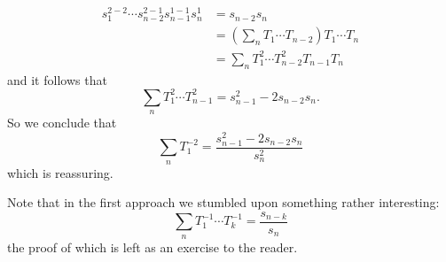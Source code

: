 \begin{sol}
\begin{enumerate}
            \begin{align*}
                s_1^{2-2}\cdots s_{n-2}^{2-1}s_{n-1}^{1-1}s_n^1&=s_{n-2}s_n\\
                &=\left(\sum_n T_1\cdots T_{n-2}\right)T_1\cdots T_n\\
                &=\sum_n T_1^2\cdots T_{n-2}^2 T_{n-1}T_n
            \end{align*}
            and it follows that
            $$\sum_n T_1^2\cdots T_{n-1}^2 = s_{n-1}^2-2s_{n-2}s_n.$$
            So we conclude that
            $$ \sum_n T_1^{-2} = \frac{s_{n-1}^2-2s_{n-2}s_n}{s_n^2}$$
            which is reassuring.
        \end{enumerate}
        Note that in the first approach we stumbled upon something rather interesting:
        $$
            \sum_n T_1^{-1}\cdots T_k^{-1} = \frac{s_{n-k}}{s_n}
        $$
        the proof of which is left as an exercise to the reader.
    \end{sol}

    \begin{ex}{14.24}
        
    \end{ex}